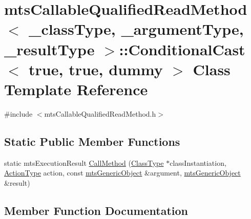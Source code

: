 \hypertarget{classmts_callable_qualified_read_method_1_1_conditional_cast_3_01true_00_01true_00_01dummy_01_4}{}\section{mts\+Callable\+Qualified\+Read\+Method$<$ \+\_\+class\+Type, \+\_\+argument\+Type, \+\_\+result\+Type $>$\+:\+:Conditional\+Cast$<$ true, true, dummy $>$ Class Template Reference}
\label{classmts_callable_qualified_read_method_1_1_conditional_cast_3_01true_00_01true_00_01dummy_01_4}


{\ttfamily \#include $<$mts\+Callable\+Qualified\+Read\+Method.\+h$>$}

\subsection*{Static Public Member Functions}
\begin{DoxyCompactItemize}
\item 
static mts\+Execution\+Result \hyperlink{classmts_callable_qualified_read_method_1_1_conditional_cast_3_01true_00_01true_00_01dummy_01_4_afebded2ba9c6c10ef311e04bea48d5d4}{Call\+Method} (\hyperlink{classmts_callable_qualified_read_method_a6cfee5c3c3c49c691c2f5176ea79d735}{Class\+Type} $\ast$class\+Instantiation, \hyperlink{classmts_callable_qualified_read_method_a6327de6d1017295be394178d8e03b121}{Action\+Type} action, const \hyperlink{classmts_generic_object}{mts\+Generic\+Object} \&argument, \hyperlink{classmts_generic_object}{mts\+Generic\+Object} \&result)
\end{DoxyCompactItemize}


\subsection{Member Function Documentation}
\hypertarget{classmts_callable_qualified_read_method_1_1_conditional_cast_3_01true_00_01true_00_01dummy_01_4_afebded2ba9c6c10ef311e04bea48d5d4}{}
